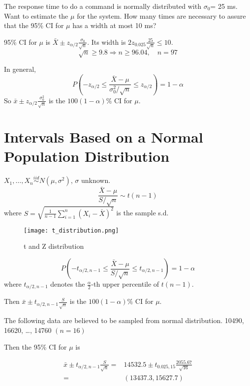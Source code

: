 \begin{exmp}
The response time to do a command is normally distributed with $\sigma_0$= 25 ms. Want to estimate the $\mu$ for the system. How many times are necessary to assure that the 95\% CI for $\mu$ has a width at most 10 ms? 

95\% CI for $\mu$ is $\bar{X}\pm z_{\alpha/2} \frac{\sigma_0}{\sqrt{n}} $. Its width is $2 z_{0.025} \frac{25}{\sqrt{n}} \leq 10$.
\[\sqrt{n}\geq 9.8 \Rightarrow n\geq 96.04, \quad n=97\]

\end{exmp}

\begin{prop}
In general,
 \[P\left(-z_{\alpha/2} \leq \frac{\bar{X}-\mu}{\sigma_0^2/\sqrt{n}}  \leq  z_{\alpha/2} \right) = 1-\alpha\]
So $\bar{x} \pm  z_{\alpha/2} \frac{\sigma_0^2}{\sqrt{n}} $ is the $100(1-\alpha)\%$ CI for $\mu$.
\end{prop}

\section{Intervals Based on a Normal Population Distribution}
\noindent{}

\begin{theo}
$X_1,\dots,X_n \overset{iid}{\sim} N(\mu,\sigma^2)$, $\sigma$ unknown.
\[\frac{\bar{X}-\mu}{S/\sqrt{n}} \sim t(n-1)\]
where $S=\sqrt{\frac{1}{n-1} \sum_{i=1}^n (X_i-\bar{X})^2}$ is the sample s.d.

\begin{figure}[H]
\caption{t and Z distribution}
\centering
\texttt{[image: t\_distribution.png]}
\end{figure}

\[P\left(-t_{\alpha/2,n-1} \leq \frac{\bar{X}-\mu}{S/\sqrt{n}}  \leq  t_{\alpha/2,n-1} \right) = 1-\alpha\]
where $t_{\alpha/2,n-1}$ denotes the $\frac{\alpha}{2}$-th upper percentile of $t(n-1)$.

Then $\bar{x} \pm  t_{\alpha/2,n-1} \frac{S}{\sqrt{n}} $ is the $100(1-\alpha)\%$ CI for $\mu$.
\end{theo}

\begin{exmp}
The following data are believed to be sampled from normal distribution. 10490, 16620, \dots, 14760 $(n=16)$

Then the 95\% CI for $\mu$ is 

\begin{align*}
\bar{x} \pm  t_{\alpha/2,n-1} \frac{S}{\sqrt{n}}=&14532.5 \pm  t_{0.025,15} \frac{2055.67}{\sqrt{16}}\\
=&(13437.3, 15627.7)
\end{align*} 

\end{exmp}
